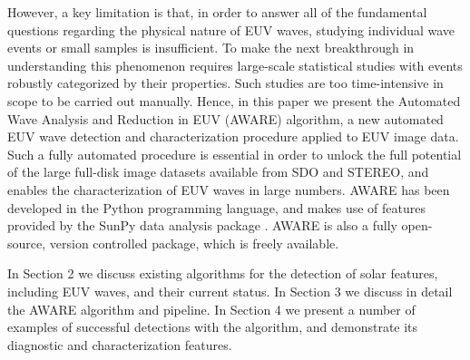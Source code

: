 However, a key limitation is that, in order to answer all of the
fundamental questions regarding the physical nature of EUV waves,
studying individual wave events or small samples is insufficient. To
make the next breakthrough in understanding this phenomenon requires
large-scale statistical studies with events robustly categorized by
their properties. Such studies are too time-intensive in scope to be
carried out manually. Hence, in this paper we present the Automated
Wave Analysis and Reduction in EUV (AWARE) algorithm, a new automated
EUV wave detection and characterization procedure applied to EUV image
data. Such a fully automated procedure is essential in order to unlock
the full potential of the large full-disk image datasets available
from SDO and STEREO, and enables the characterization of EUV waves in
large numbers. AWARE has been developed in the Python programming
language, and makes use of features provided by the SunPy data
analysis package \citep{mumford-proc-scipy-2013}. AWARE is also a
fully open-source, version controlled package, which is freely
available.

In Section 2 we discuss existing algorithms for the detection of solar
features, including EUV waves, and their current status. In Section 3
we discuss in detail the AWARE algorithm and pipeline. In Section 4 we
present a number of examples of successful detections with the
algorithm, and demonstrate its diagnostic and characterization
features.






